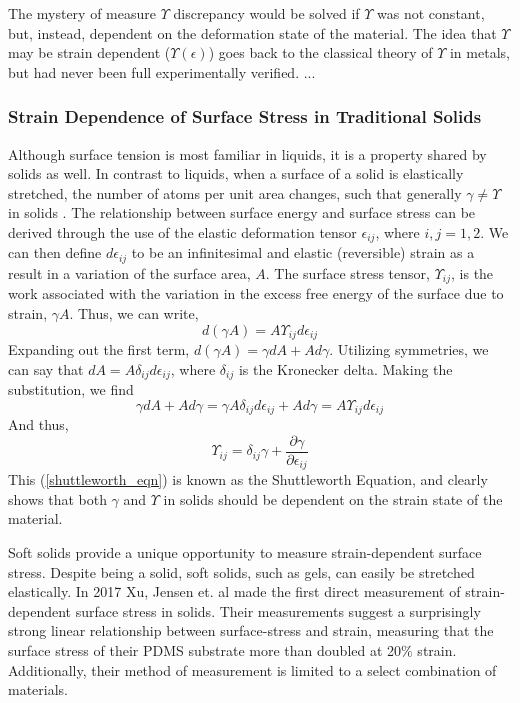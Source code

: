 The mystery of measure $ \Upsilon $ discrepancy would be solved if $ \Upsilon $ was not constant, but, instead, dependent on the deformation state of the material. The idea that $ \Upsilon $ may be strain dependent ($ \Upsilon(\epsilon) $) goes back to the classical theory of $ \Upsilon $ in metals, but had never been full experimentally verified. ...

\subsubsection{Strain Dependence of Surface Stress in Traditional Solids}
Although surface tension is most familiar in liquids, it is a property shared by solids as well.  In contrast to liquids, when a surface of a solid is elastically stretched, the number of atoms per unit area changes, such that generally $ \gamma \neq \Upsilon$ in solids \cite{cammarata1994surface}. The relationship between surface energy and surface stress can be derived through the use of the elastic deformation tensor $\epsilon_{ij}$, where $i,j=1,2$. We can then define $d\epsilon_{ij}$ to be an infinitesimal and elastic (reversible) strain as a result in a variation of the surface area, $A$. The surface stress tensor, $\Upsilon_{ij}$, is the work associated with the variation in the excess free energy of the surface due to strain, $\gamma A$. Thus, we can write, \[d(\gamma A) = A \Upsilon_{ij} d\epsilon_{ij}\] Expanding out the first term, $d(\gamma A) = \gamma dA + A d\gamma$. Utilizing symmetries, we can say that $dA = A \delta_{ij} d\epsilon_{ij}$, where $\delta_{ij}$ is the Kronecker delta. Making the substitution, we find \[\gamma dA + A d\gamma = \gamma A \delta_{ij} d\epsilon_{ij} + A d\gamma = A \Upsilon_{ij} d\epsilon_{ij}\] And thus,
\begin{equation}
\label{shuttleworth_eqn}
\Upsilon_{ij} = \delta_{ij}\gamma + \frac{\partial \gamma}{\partial \epsilon_{ij}} 
\end{equation}
This (\ref{shuttleworth_eqn}) is known as the Shuttleworth Equation, and clearly shows that both $\gamma$ and $\Upsilon$ in solids should be dependent on the strain state of the material.

Soft solids provide a unique opportunity to measure strain-dependent surface stress. Despite being a solid, soft solids, such as gels, can easily be stretched elastically. In 2017 Xu, Jensen et. al \cite{xu2017direct} made the first direct measurement of strain-dependent surface stress in solids. Their measurements suggest a surprisingly strong linear relationship between surface-stress and strain, measuring that the surface stress of their PDMS substrate more than doubled at 20\% strain. Additionally, their method of measurement is limited to a select combination of materials. 

